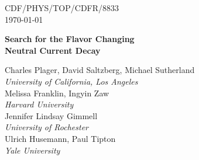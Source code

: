 \documentclass[12pt,letterpaper]{article}
\newcommand{\clearemptydoublepage}{\newpage{\pagestyle{empty}\cleardoublepage}}
\begin{document}
\thispagestyle{empty}
\vspace*{-0.5in}
\begin{flushright}

CDF/PHYS/TOP/CDFR/$8833$ \\
\today\\
\end{flushright}
\vspace{0.5in}
\begin{center}
\begin{huge}
{\bf Search for the Flavor Changing\\[1mm] Neutral Current Decay \boldmath\tZq\unboldmath}
\end{huge}
\end{center}
\vspace{0.5in}
\begin{center}
\begin{large}

{Charles Plager, David Saltzberg, Michael Sutherland}\\
{\em University of California, Los Angeles}\\[5mm]

{Melissa Franklin, Ingyin Zaw}\\
{\em Harvard University}\\[5mm]

{Jennifer Lindsay Gimmell}\\
{\em University of Rochester}\\[5mm]

{Ulrich Husemann, Paul Tipton}\\
{\em Yale University}\\[5mm]

\end{large}
\end{center}

\normalsize

\vspace{5mm}

\begin{abstract}

\end{abstract}

%

\clearemptydoublepage

\tableofcontents

\clearemptydoublepage


\end{document}

